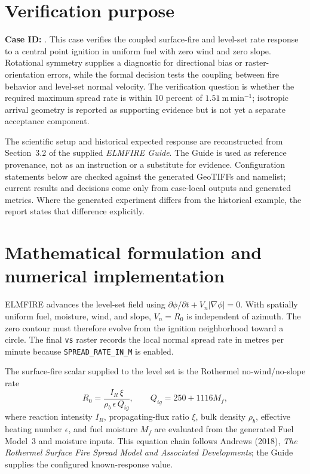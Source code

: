 \section{Verification purpose}

\textbf{Case ID:} \texttt{\CaseID}. This case verifies the coupled surface-fire and level-set rate response to a central point ignition in uniform fuel with zero wind and zero slope. Rotational symmetry supplies a diagnostic for directional bias or raster-orientation errors, while the formal decision tests the coupling between fire behavior and level-set normal velocity. The verification question is whether the required maximum spread rate is within 10 percent of \(1.51~\mathrm{m\,min^{-1}}\); isotropic arrival geometry is reported as supporting evidence but is not yet a separate acceptance component.

The scientific setup and historical expected response are reconstructed from Section~3.2 of the supplied \emph{ELMFIRE Guide}. The Guide is used as reference provenance, not as an instruction or a substitute for evidence. Configuration statements below are checked against the generated GeoTIFFs and namelist; current results and decisions come only from case-local outputs and generated metrics. Where the generated experiment differs from the historical example, the report states that difference explicitly.

\section{Mathematical formulation and numerical implementation}

ELMFIRE advances the level-set field using \(\partial\phi/\partial t+V_n|\nabla\phi|=0\).  With spatially uniform fuel, moisture, wind, and slope, \(V_n=R_0\) is independent of azimuth.  The zero contour must therefore evolve from the ignition neighborhood toward a circle.  The final \texttt{vs} raster records the local normal spread rate in metres per minute because \texttt{SPREAD\_RATE\_IN\_M} is enabled.

The surface-fire scalar supplied to the level set is the Rothermel no-wind/no-slope rate
\begin{equation}
R_0=\frac{I_R\,\xi}{\rho_b\,\epsilon\,Q_{ig}}, \qquad Q_{ig}=250+1116M_f,
\end{equation}
where reaction intensity \(I_R\), propagating-flux ratio \(\xi\), bulk density \(\rho_b\), effective heating number \(\epsilon\), and fuel moisture \(M_f\) are evaluated from the generated Fuel Model~3 and moisture inputs. This equation chain follows Andrews (2018), \emph{The Rothermel Surface Fire Spread Model and Associated Developments}; the Guide supplies the configured known-response value.

